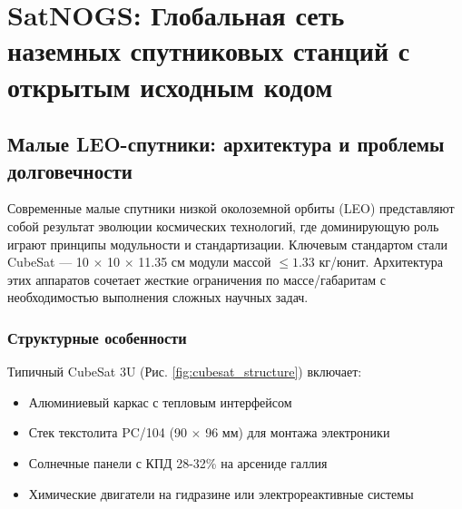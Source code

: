 \chapter{SatNOGS: Глобальная сеть наземных спутниковых станций с открытым исходным кодом}

\section{Малые LEO-спутники: архитектура и проблемы долговечности}  
Современные малые спутники низкой околоземной орбиты (LEO) представляют собой результат эволюции космических технологий, где доминирующую роль играют принципы модульности и стандартизации. Ключевым стандартом стали CubeSat — 10 $\times$ 10 $\times$ 11.35 см модули массой $\leq 1.33$ кг/юнит. Архитектура этих аппаратов сочетает жесткие ограничения по массе/габаритам с необходимостью выполнения сложных научных задач.

\subsection{Структурные особенности}  
Типичный CubeSat 3U (Рис. \ref{fig:cubesat_structure}) включает:  
\begin{itemize}  
\item Алюминиевый каркас с тепловым интерфейсом  
\item Стек текстолита PC/104 (90 $\times$ 96 мм) для монтажа электроники  
\item Солнечные панели с КПД 28-32\% на арсениде галлия  
\item Химические двигатели на гидразине или электрореактивные системы  
\end{itemize}  

